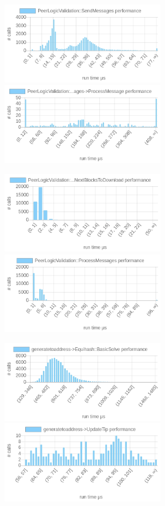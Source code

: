 \documentclass{article}
\begin{document}
\begin{table}
	\includegraphics[width=7cm]{images/local/chartPeerLogicValidation_3A_3ASendMessages.png}
	\includegraphics[width=7cm]{images/local/chartPeerLogicValidation_3A_3AProcessMessages-_3EProcessMessage.png}
	
	\includegraphics[width=7cm]{images/local/chartPeerLogicValidation_3A_3ASendMessages-_3EFindNextBlocksToDownload.png}
	\includegraphics[width=7cm]{images/local/chartPeerLogicValidation_3A_3AProcessMessages.png}

	\includegraphics[width=7cm]{images/local/chartgeneratetoaddress-_3EEquihash_3A_3ABasicSolve.png}
	\includegraphics[width=7cm]{images/local/chartgeneratetoaddress-_3EUpdateTip.png}
	

\end{table}
\end{document}

